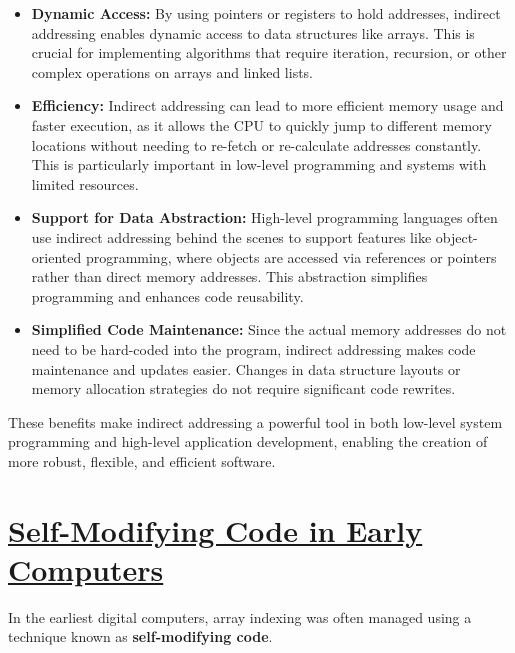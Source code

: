 \documentclass[12pt, oneside]{book}
\begin{document}
\begin{itemize}
\begin{itemize}
\begin{itemize}
			\item \textbf{Dynamic Access:} By using pointers or registers to hold addresses, indirect addressing enables dynamic access to data structures like arrays. This is crucial for implementing algorithms that require iteration, recursion, or other complex operations on arrays and linked lists.
			
			\item \textbf{Efficiency:} Indirect addressing can lead to more efficient memory usage and faster execution, as it allows the CPU to quickly jump to different memory locations without needing to re-fetch or re-calculate addresses constantly. This is particularly important in low-level programming and systems with limited resources.
			
			\item \textbf{Support for Data Abstraction:} High-level programming languages often use indirect addressing behind the scenes to support features like object-oriented programming, where objects are accessed via references or pointers rather than direct memory addresses. This abstraction simplifies programming and enhances code reusability.
			
			\item \textbf{Simplified Code Maintenance:} Since the actual memory addresses do not need to be hard-coded into the program, indirect addressing makes code maintenance and updates easier. Changes in data structure layouts or memory allocation strategies do not require significant code rewrites.
		\end{itemize}
		These benefits make indirect addressing a powerful tool in both low-level system programming and high-level application development, enabling the creation of more robust, flexible, and efficient software.
	\end{itemize}
\end{itemize}


\section{\href{https://en.wikipedia.org/wiki/Self-modifying_code}{Self-Modifying Code in Early Computers}}
	
	In the earliest digital computers, array indexing was often managed using a technique known as \textbf{self-modifying code}.
	
\end{document}
